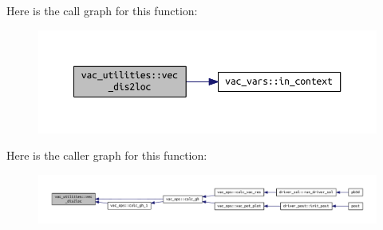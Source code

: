 Here is the call graph for this function\+:\nopagebreak
\begin{figure}[H]
\begin{center}
\leavevmode
\includegraphics[width=350pt]{namespacevac__utilities_a05e8e1f24569b4bff05e61a867268fc3_cgraph}
\end{center}
\end{figure}
Here is the caller graph for this function\+:\nopagebreak
\begin{figure}[H]
\begin{center}
\leavevmode
\includegraphics[width=350pt]{namespacevac__utilities_a05e8e1f24569b4bff05e61a867268fc3_icgraph}
\end{center}
\end{figure}
